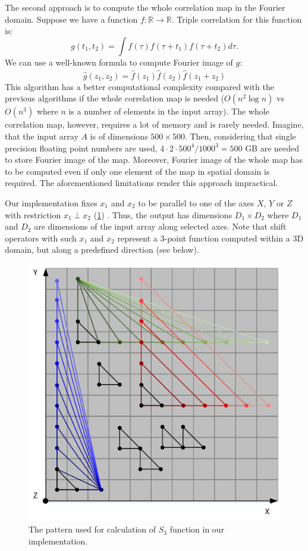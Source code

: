 \documentclass[reprint,amsmath,amssymb,aps,pre,showkeys,showpacs]{revtex4-1}
\begin{document}
The second approach is to compute the whole correlation map in the Fourier
domain. Suppose we have a function
$f: \mathbb{R} \rightarrow \mathbb{R}$. Triple correlation for this function is:
\begin{equation}
  g(t_1, t_2) = \int f(\tau) f(\tau + t_1) f(\tau + t_2) d \tau.
\end{equation}
We can use a well-known formula to compute Fourier image of $g$:
\begin{equation}
  \hat{g}(z_1, z_2) = \hat{f}(z_1) \hat{f}(z_2) \overline{\hat{f}(z_1 + z_2)}
\end{equation}
This algorithm has a better computational complexity compared with the previous
algorithms if the whole correlation map is needed ($O(n^2 \log n)$ vs
$O(n^3)$ where $n$ is a number of elements in the input array). The whole
correlation map, however, requires a lot of memory and is rarely
needed. Imagine, that the input array $A$ is of dimensions $500 \times 500$.
Then, considering that single precision floating point numbers are used,
$4 \cdot 2 \cdot 500^4 / 1000^3 = 500$ GB are needed to store Fourier image of
the map. Moreover, Fourier image of the whole map has to be computed even if only one
element of the map in spatial domain is required. The aforementioned limitations
render this approach impractical.

Our implementation fixes $x_1$ and $x_2$ to be parallel to one of the axes $X$,
$Y$ or $Z$ with restriction $x_1 \perp x_2$ (\cref{fig:pattern})
\cite{dimitrakopoulos2010high}. Thus, the output has dimensions $D_1 \times D_2$
where $D_1$ and $D_2$ are dimensions of the input array along selected
axes. Note that shift operators with such $x_1$ and $x_2$ represent a 3-point
function computed within a 3D domain, but along a predefined direction (see
below).
\begin{figure}[ht]
  \centering
  \includegraphics[width=0.5\linewidth]{images/pattern.png}
  \caption[]{The pattern used for calculation of $S_3$ function in our
    implementation.}
  \label{fig:pattern}
\end{figure}
\end{document}
